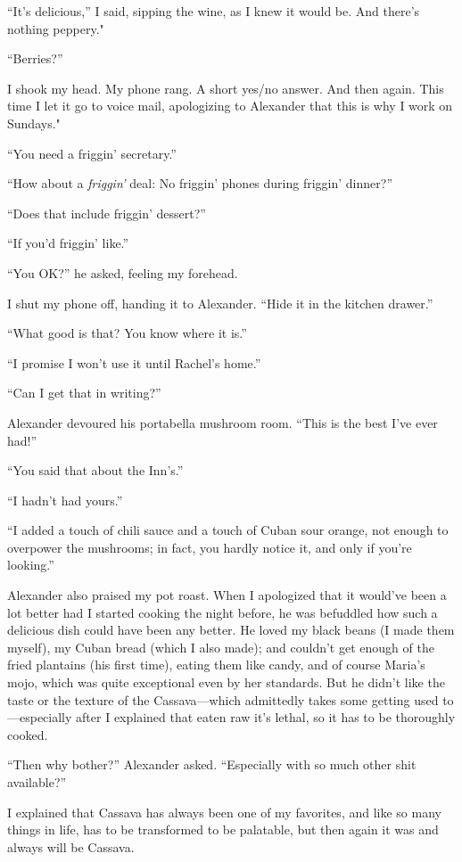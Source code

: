 ``It's delicious,'' I said, sipping the wine, as I knew it would be. And
there's nothing peppery."

``Berries?''

I shook my head. My phone rang. A short yes/no answer. And then again.
This time I let it go to voice mail, apologizing to Alexander that this
is why I work on Sundays."

``You need a friggin' secretary.''

``How about a \emph{friggin'} deal: No friggin' phones during friggin'
dinner?''

``Does that include friggin' dessert?''

``If you'd friggin' like.''

``You OK?'' he asked, feeling my forehead.

I shut my phone off, handing it to Alexander. ``Hide it in the kitchen
drawer.''

``What good is that? You know where it is.''

``I promise I won't use it until Rachel's home.''

``Can I get that in writing?''

Alexander devoured his portabella mushroom room. ``This is the best I've
ever had!''

``You said that about the Inn's.''

``I hadn't had yours.''

``I added a touch of chili sauce and a touch of Cuban sour orange, not
enough to overpower the mushrooms; in fact, you hardly notice it, and
only if you're looking.''

Alexander also praised my pot roast. When I apologized that it would've
been a lot better had I started cooking the night before, he was
befuddled how such a delicious dish could have been any better. He loved
my black beans (I made them myself), my Cuban bread (which I also made);
and couldn't get enough of the fried plantains (his first time), eating
them like candy, and of course Maria's mojo, which was quite exceptional
even by her standards. But he didn't like the taste or the texture of
the Cassava---which admittedly takes some getting used to---especially
after I explained that eaten raw it's lethal, so it has to be thoroughly
cooked.

``Then why bother?'' Alexander asked. ``Especially with so much other
shit available?''

I explained that Cassava has always been one of my favorites, and like
so many things in life, has to be transformed to be palatable, but then
again it was and always will be Cassava.

